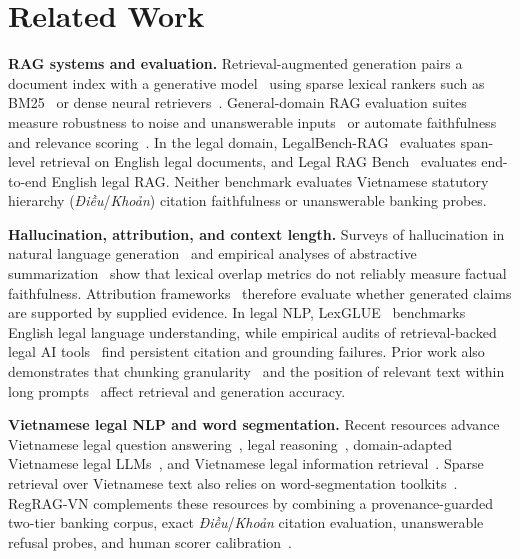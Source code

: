 \documentclass[conference,a4paper]{IEEEtran}
\begin{document}
\section{Related Work}
\label{sec:related}

\textbf{RAG systems and evaluation.} Retrieval-augmented generation pairs a document index with a generative model~\cite{lewis2020rag,gao2024ragsurvey} using sparse lexical rankers such as BM25~\cite{robertson2009bm25,rankbm25} or dense neural retrievers~\cite{karpukhin2020dpr,chen2024m3}. General-domain RAG evaluation suites measure robustness to noise and unanswerable inputs~\cite{liu2024rgb} or automate faithfulness and relevance scoring~\cite{es2024ragas}. In the legal domain, LegalBench-RAG~\cite{pipitone2024legalbenchrag} evaluates span-level retrieval on English legal documents, and Legal RAG Bench~\cite{butler2026legalragbench} evaluates end-to-end English legal RAG. Neither benchmark evaluates Vietnamese statutory hierarchy (\emph{Điều}/\emph{Khoản}) citation faithfulness or unanswerable banking probes.

\textbf{Hallucination, attribution, and context length.} Surveys of hallucination in natural language generation~\cite{ji2023hallucination} and empirical analyses of abstractive summarization~\cite{maynez2020faithfulness} show that lexical overlap metrics do not reliably measure factual faithfulness. Attribution frameworks~\cite{rashkin2023attribution,bohnet2022attributed,min2023factscore} therefore evaluate whether generated claims are supported by supplied evidence. In legal NLP, LexGLUE~\cite{chalkidis2022lexglue} benchmarks English legal language understanding, while empirical audits of retrieval-backed legal AI tools~\cite{magesh2025hallucinationfree} find persistent citation and grounding failures. Prior work also demonstrates that chunking granularity~\cite{qin2025mixgranularity} and the position of relevant text within long prompts~\cite{liu2024lostmiddle} affect retrieval and generation accuracy.

\textbf{Vietnamese legal NLP and word segmentation.} Recent resources advance Vietnamese legal question answering~\cite{nguyen2025vlqa}, legal reasoning~\cite{dong2025vlegalbench}, domain-adapted Vietnamese legal LLMs~\cite{nguyen2026vilegallm}, and Vietnamese legal information retrieval~\cite{nguyen2024vnlegalir}. Sparse retrieval over Vietnamese text also relies on word-segmentation toolkits~\cite{vu2018vncorenlp,pyvi}. RegRAG-VN complements these resources by combining a provenance-guarded two-tier banking corpus, exact \emph{Điều}/\emph{Khoản} citation evaluation, unanswerable refusal probes, and human scorer calibration~\cite{cohen1960kappa}.
\end{document}
